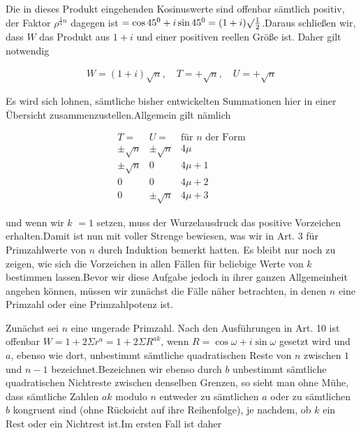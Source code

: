 Die in dieses Produkt eingehenden Kosinuswerte sind offenbar sämtlich positiv, der Faktor $\rho^{\frac14n}$ dagegen ist $=\cos45^0+i\sin45^0=(1+i)\surd\frac12$.\quad Daraus schließen wir, dass $W$ das Produkt aus $1+i$ und einer positiven reellen Größe ist. Daher gilt notwendig

\[
\begin{aligned}
W=(1+i)\surd n,\quad T=+\surd n,\quad U=+\surd n
\end{aligned}
\]


Es wird sich lohnen, sämtliche bisher entwickelten Summationen hier in einer Übersicht zusammenzustellen.\quad Allgemein gilt nämlich

\[
\begin{array}{c|c|c}
T=&U=&\text{für }n\text{ der Form}\\\hline
\pm\surd n&\pm\surd n&4\mu\\
\pm\surd n&0&4\mu+1\\
0&0&4\mu+2\\
0&\pm\surd n&4\mu+3
\end{array}
\]

und wenn wir $k$ $=1$ setzen, muss der Wurzelausdruck das positive Vorzeichen erhalten.\quad Damit ist nun mit voller Strenge bewiesen, was wir in Art. 3 für Primzahlwerte von $n$ durch Induktion bemerkt hatten. Es bleibt nur noch zu zeigen, wie sich die Vorzeichen in allen Fällen für beliebige Werte von $k$ bestimmen lassen.\quad Bevor wir diese Aufgabe jedoch in ihrer ganzen Allgemeinheit angehen können, müssen wir zunächst die Fälle näher betrachten, in denen $n$ eine Primzahl oder eine Primzahlpotenz ist.


Zunächst sei $n$ eine ungerade Primzahl. Nach den Ausführungen in Art. 10 ist offenbar $W=1+2\Sigma r^a=1+2\Sigma R^{ak}$, wenn $R=\cos\omega+i\sin\omega$ gesetzt wird und $a$, ebenso wie dort, unbestimmt sämtliche quadratischen Reste von $n$ zwischen $1$ und $n-1$ bezeichnet.\quad Bezeichnen wir ebenso durch $b$ unbestimmt sämtliche quadratischen Nichtreste zwischen denselben Grenzen, so sieht man ohne Mühe, dass sämtliche Zahlen $ak$ modulo $n$ entweder zu sämtlichen $a$ oder zu sämtlichen $b$ kongruent sind (ohne Rücksicht auf ihre Reihenfolge), je nachdem, ob $k$ ein Rest oder ein Nichtrest ist.\quad Im ersten Fall ist daher


